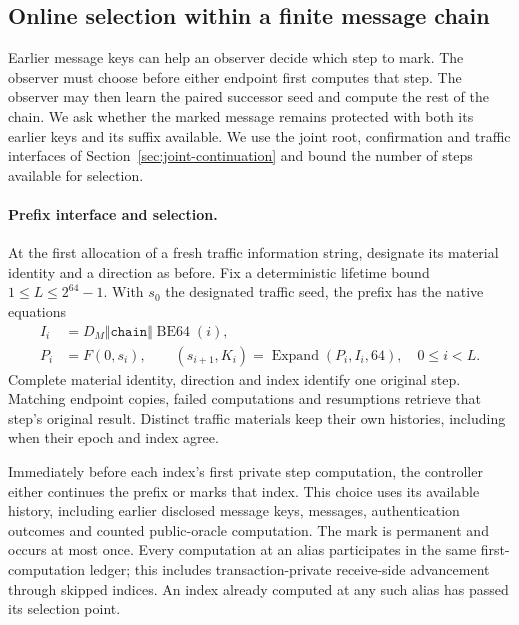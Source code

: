 \subsection{Online selection within a finite message chain}
\label{sec:chain-prefix}

Earlier message keys can help an observer decide which step to mark.
The observer must choose before either endpoint first computes that step.
The observer may then learn the paired successor seed and compute the
rest of the chain. We ask whether the marked message remains protected
with both its earlier keys and its suffix available. We use the joint
root, confirmation and traffic interfaces of
Section~\ref{sec:joint-continuation} and bound the number of steps
available for selection.

\paragraph{Prefix interface and selection.}
At the first allocation of a fresh traffic information string, designate
its material identity and a direction as before. Fix a deterministic
lifetime bound $1\le L\le 2^{64}-1$. With $s_0$ the designated traffic
seed, the prefix has the native equations
\begin{equation}
\begin{split}
 I_i&=D_M\Vert\texttt{chain}\Vert\operatorname{BE64}(i),\\
 P_i&=F(0,s_i),\qquad
 (s_{i+1},K_i)=\operatorname{Expand}(P_i,I_i,64),
 \quad 0\le i<L.
\end{split}
\label{eq:prefix-chain}
\end{equation}
Complete material identity, direction and index identify one original
step. Matching endpoint copies, failed computations and resumptions
retrieve that step's original result. Distinct traffic materials keep
their own histories, including when their epoch and index agree.

Immediately before each index's first private step computation, the
controller either continues the prefix or marks that index. This choice
uses its available history, including earlier disclosed message keys,
messages, authentication outcomes and counted public-oracle computation.
The mark is permanent and occurs at most once. Every computation at an
alias participates in the same first-computation ledger; this includes
transaction-private receive-side advancement through skipped indices.
An index already computed at any such alias has passed its selection point.

